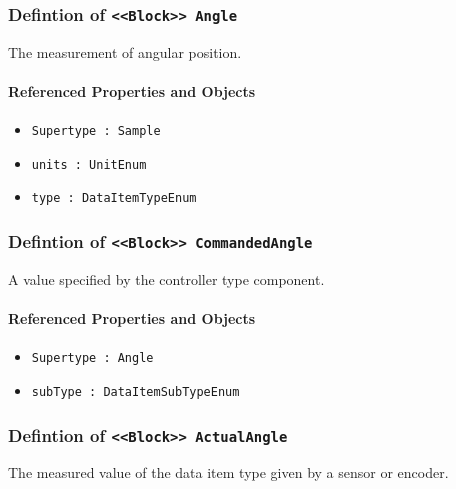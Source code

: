 \subsubsection{Defintion of \texttt{<<Block>> Angle}}
  \label{type:Angle}

\FloatBarrier

The measurement of angular position.

\FloatBarrier
\paragraph{Referenced Properties and Objects}

\begin{itemize}
\item \texttt{Supertype : Sample}

\item \texttt{units : UnitEnum}

\item \texttt{type : DataItemTypeEnum}

\end{itemize}
\FloatBarrier
\subsubsection{Defintion of \texttt{<<Block>> CommandedAngle}}
  \label{type:CommandedAngle}

\FloatBarrier

A value specified by the controller type component.

\FloatBarrier
\paragraph{Referenced Properties and Objects}

\begin{itemize}
\item \texttt{Supertype : Angle}

\item \texttt{subType : DataItemSubTypeEnum}

\end{itemize}
\FloatBarrier
\subsubsection{Defintion of \texttt{<<Block>> ActualAngle}}
  \label{type:ActualAngle}

\FloatBarrier

The measured value of the data item type given by a sensor or encoder.

